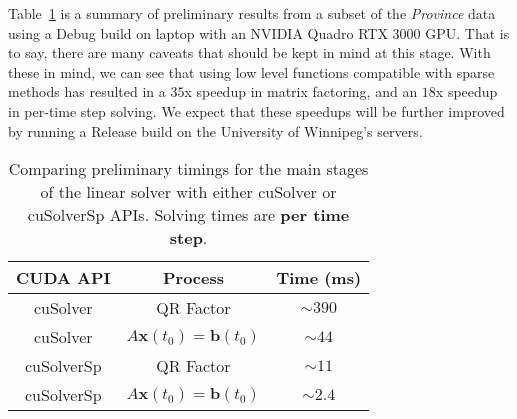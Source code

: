 \documentclass[11pt,letterpaper]{article}
\begin{document}
Table~\ref{t: timings} is a summary of preliminary results from a subset of the \emph{Province} data using a Debug build on laptop with an NVIDIA Quadro RTX 3000 GPU. That is to say, there are many caveats that should be kept in mind at this stage. With these in mind, we can see that using low level functions compatible with sparse methods has resulted in a $35$x speedup in matrix factoring, and an $18$x speedup in per-time step solving. We expect that these speedups will be further improved by running a Release build on the University of Winnipeg's servers.

\begin{table}[b]
  \centering
  \begin{tabular}{| c | c | c |}
    \hline
    {\bf CUDA API} & {\bf Process} & {\bf Time (ms)} \\ \hline
    cuSolver & QR Factor & $\sim 390$ \\ \hline
    cuSolver & $A{\mathbf x}(t_0) = {\mathbf b}(t_0)$ & $\sim 44$ \\ \hline
    cuSolverSp & QR Factor & $\sim 11$ \\ \hline
    cuSolverSp & $A{\mathbf x}(t_0) = {\mathbf b}(t_0)$ & $\sim 2.4$ \\ \hline
  \end{tabular}
  \caption{Comparing preliminary timings for the main stages of the linear solver with either cuSolver or cuSolverSp APIs. Solving times are {\bf per time step}.}
  \label{t: timings}
\end{table}
\end{document}
